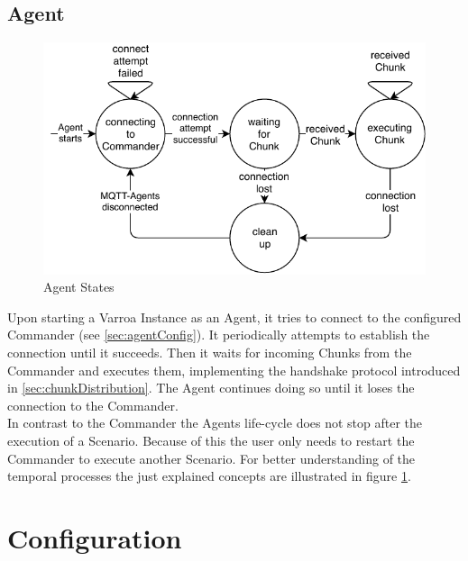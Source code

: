 \subsection{Agent}
\begin{figure}[H]
	\begin{center}
	\includegraphics[scale=0.9]{Resources/PDF/AgentStates}
	\caption{Agent States}
	\label{pic:AgentStates}
	\end{center}
\end{figure}
Upon starting a Varroa Instance as an Agent, it tries to connect to the configured Commander (see \ref{sec:agentConfig}).
It periodically attempts to establish the connection until it succeeds.
Then it waits for incoming Chunks from the Commander and executes them, implementing the handshake protocol introduced in \ref{sec:chunkDistribution}.
The Agent continues doing so until it loses the connection to the Commander.\\
In contrast to the Commander the Agents life-cycle does not stop after the execution of a Scenario.
Because of this the user only needs to restart the Commander to execute another Scenario.
For better understanding of the temporal processes the just explained concepts are illustrated in figure \ref{pic:AgentStates}.

\section{Configuration}
